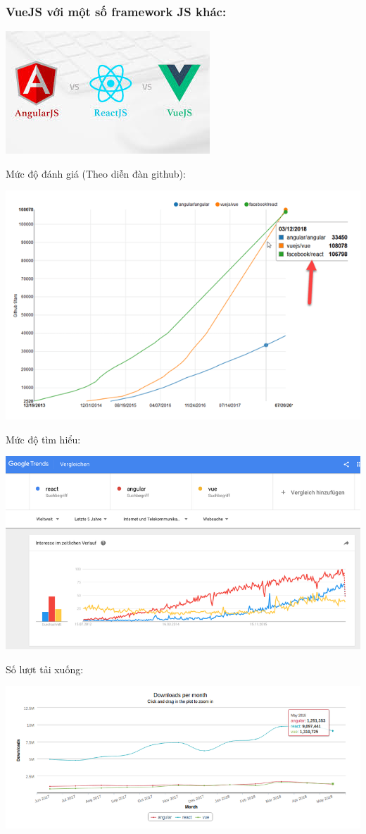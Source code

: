 \documentclass[12pt,a4paper]{report}
\begin{document}
\subsubsection{VueJS với một số framework JS khác:}
\begin{center}
	\includegraphics[scale=.8]{2}
\end{center}
Mức độ đánh giá (Theo diễn đàn github):
\begin{center}
	\includegraphics[scale=.7]{3}
\end{center}
Mức độ tìm hiểu:
\begin{center}
	\includegraphics[scale=.52]{4}
\end{center}
Số lượt tải xuống:
\begin{center}
	\includegraphics[scale=.55]{5}
\end{center}
\end{document}

